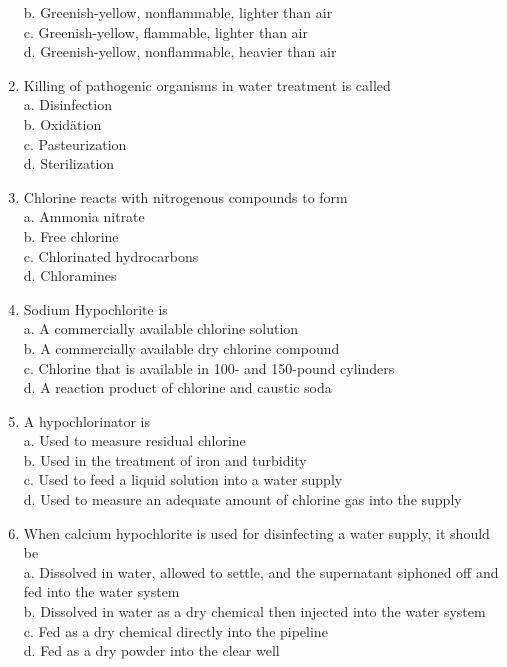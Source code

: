 \documentclass{article}
\begin{document}
\begin{enumerate}
b. Greenish-yellow, nonflammable, lighter than air\\
c. Greenish-yellow, flammable, lighter than air\\
d.  Greenish-yellow, nonflammable, heavier than air\\
  \item Killing of pathogenic organisms in water treatment is called\\
a. Disinfection\\
b. Oxidätion\\
c. Pasteurization\\
d. Sterilization\\
\item Chlorine reacts with nitrogenous compounds to form\\
a. Ammonia nitrate\\
b. Free chlorine\\
c. Chlorinated hydrocarbons\\
d. Chloramines\\
  \item Sodium Hypochlorite is\\
a. A commercially available chlorine solution\\
b. A commercially available dry chlorine compound\\
c. Chlorine that is available in 100- and 150-pound cylinders\\
d. A reaction product of chlorine and caustic soda\\
\item A hypochlorinator is\\
a. Used to measure residual chlorine\\
b. Used in the treatment of iron and turbidity\\
c. Used to feed a liquid solution into a water supply\\
d. Used to measure an adequate amount of chlorine gas into the supply\\
  \item When calcium hypochlorite is used for disinfecting a water supply, it should be\\
a.	 Dissolved in water, allowed to settle, and the supernatant siphoned off and fed into the water system\\
b. Dissolved in water as a dry chemical then injected into the water system\\
c. Fed as a dry chemical directly into the pipeline\\
d. Fed as a dry powder into the clear well\\

\end{enumerate}
\end{document}
